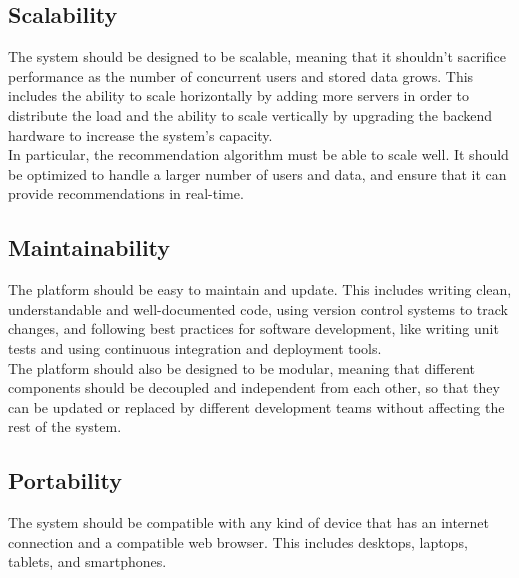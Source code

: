\subsection{Scalability}
The system should be designed to be scalable, meaning that it shouldn't sacrifice performance as the number of concurrent users and stored data grows.
This includes the ability to scale horizontally by adding more servers in order to distribute the load and the ability to scale vertically by upgrading 
the backend hardware to increase the system's capacity. \\
In particular, the recommendation algorithm must be able to scale well. It should be optimized to handle a larger number of users and data, and ensure
that it can provide recommendations in real-time.

\subsection{Maintainability}
The platform should be easy to maintain and update. This includes writing clean, understandable and well-documented code, using version control systems 
to track changes, and following best practices for software development, like writing unit tests and using continuous integration and deployment tools. \\
The platform should also be designed to be modular, meaning that different components should be decoupled and independent from each other, so that
they can be updated or replaced by different development teams without affecting the rest of the system.

\subsection{Portability}
The system should be compatible with any kind of device that has an internet connection and a compatible web browser. This includes desktops, laptops,
tablets, and smartphones.
